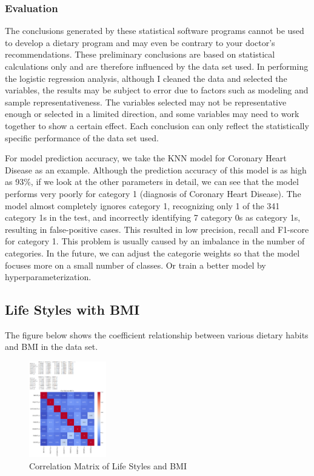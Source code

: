 \documentclass{article}
\begin{document}
\subsubsection{Evaluation}

The conclusions generated by these statistical software programs cannot be used to develop a dietary program and may even be contrary to your doctor's recommendations. These preliminary conclusions are based on statistical calculations only and are therefore influenced by the data set used. In performing the logistic regression analysis, although I cleaned the data and selected the variables, the results may be subject to error due to factors such as modeling and sample representativeness. The variables selected may not be representative enough or selected in a limited direction, and some variables may need to work together to show a certain effect. Each conclusion can only reflect the statistically specific performance of the data set used.

For model prediction accuracy, we take the KNN model for Coronary Heart Disease as an example. Although the prediction accuracy of this model is as high as 93\%, if we look at the other parameters in detail, we can see that the model performs very poorly for category 1 (diagnosis of Coronary Heart Disease). The model almost completely ignores category 1, recognizing only 1 of the 341 category 1s in the test, and incorrectly identifying 7 category 0s as category 1s, resulting in false-positive cases. This resulted in low precision, recall and F1-score for category 1. This problem is usually caused by an imbalance in the number of categories. In the future, we can adjust the categorie weights so that the model focuses more on a small number of classes. Or train a better model by hyperparameterization.


\subsection{Life Styles with BMI}

The figure below shows the coefficient relationship between various dietary habits and BMI in the data set. 

\begin{figure}[!h]
	\centering
	\includegraphics[width=0.3\textwidth]{../Image/P44.jpg}
	\caption{Correlation Matrix of Life Styles and BMI}
	\label{fig:P44}
\end{figure}
\end{document}
